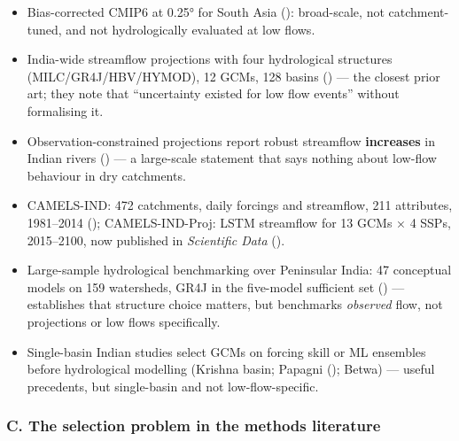 \documentclass[
  english,
  11pt,
]{article}
\providecommand{\tightlist}{%
  \setlength{\itemsep}{0pt}\setlength{\parskip}{0pt}}
\begin{document}
\begin{itemize}
\tightlist
\item
  Bias-corrected CMIP6 at 0.25° for South Asia
  ():
  broad-scale, not catchment-tuned, and not hydrologically evaluated at
  low flows.
\item
  India-wide streamflow projections with four hydrological structures
  (MILC/GR4J/HBV/HYMOD), 12 GCMs, 128 basins
  () --- the closest
  prior art; they note that ``uncertainty existed for low flow events''
  without formalising it.
\item
  Observation-constrained projections report robust streamflow
  \textbf{increases} in Indian rivers
  ()
  --- a large-scale statement that says nothing about low-flow behaviour
  in dry catchments.
\item
  CAMELS-IND: 472 catchments, daily forcings and streamflow, 211
  attributes, 1981--2014
  ();
  CAMELS-IND-Proj: LSTM streamflow for 13 GCMs × 4 SSPs, 2015--2100, now
  published in \emph{Scientific Data}
  ().
\item
  Large-sample hydrological benchmarking over Peninsular India: 47
  conceptual models on 159 watersheds, GR4J in the five-model sufficient
  set () ---
  establishes that structure choice matters, but benchmarks
  \emph{observed} flow, not projections or low flows specifically.
\item
  Single-basin Indian studies select GCMs on forcing skill or ML
  ensembles before hydrological modelling (Krishna basin; Papagni
  (); Betwa) ---
  useful precedents, but single-basin and not low-flow-specific.
\end{itemize}

\subsubsection{C. The selection problem in the methods
literature}\label{c.-the-selection-problem-in-the-methods-literature}
\end{document}
